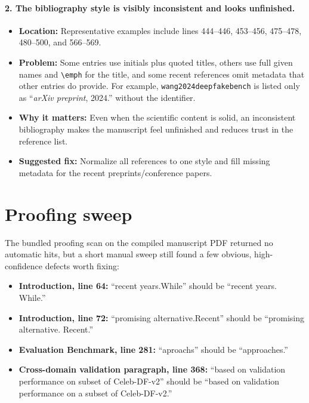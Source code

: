 \documentclass[11pt]{article}
\begin{document}
\paragraph{2. The bibliography style is visibly inconsistent and looks unfinished.}
\begin{itemize}
    \item \textbf{Location:} Representative examples include lines 444--446, 453--456, 475--478, 480--500, and 566--569.
    \item \textbf{Problem:} Some entries use initials plus quoted titles, others use full given names and \verb|\emph| for the title, and some recent references omit metadata that other entries do provide. For example, \texttt{wang2024deepfakebench} is listed only as ``\textit{arXiv preprint}, 2024.'' without the identifier.
    \item \textbf{Why it matters:} Even when the scientific content is solid, an inconsistent bibliography makes the manuscript feel unfinished and reduces trust in the reference list.
    \item \textbf{Suggested fix:} Normalize all references to one style and fill missing metadata for the recent preprints/conference papers.
\end{itemize}

\section*{Proofing sweep}
The bundled proofing scan on the compiled manuscript PDF returned no automatic hits, but a short manual sweep still found a few obvious, high-confidence defects worth fixing:
\begin{itemize}
    \item \textbf{Introduction, line 64:} ``recent years.While'' should be ``recent years. While.''
    \item \textbf{Introduction, line 72:} ``promising alternative.Recent'' should be ``promising alternative. Recent.''
    \item \textbf{Evaluation Benchmark, line 281:} ``aproachs'' should be ``approaches.''
    \item \textbf{Cross-domain validation paragraph, line 368:} ``based on validation performance on subset of Celeb-DF-v2'' should be ``based on validation performance on a subset of Celeb-DF-v2.''
\end{itemize}
\end{document}
